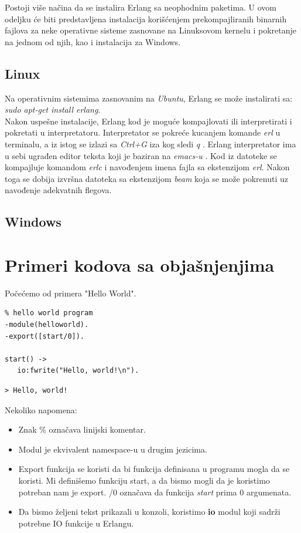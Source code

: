 \documentclass[a4paper]{article}
\begin{document}
{Postoji više načina da se instalira Erlang sa neophodnim paketima.
U ovom odeljku će biti predstavljena instalacija korišćenjem prekompajliranih binarnih fajlova 
za neke operativne sisteme zasnovane na Linuksovom kernelu i pokretanje na jednom od njih, kao 
i instalacija za Windows.

\subsection{Linux}
\label{subsec:instalacijaLinux}

Na operativnim sistemima zasnovanim na {\em Ubuntu}, Erlang se može instalirati sa:
{\em sudo apt-get install erlang}. \\

Nakon uspešne instalacije, Erlang kod je moguće kompajlovati
ili interpretirati i pokretati u interpretatoru.
Interpretator se pokreće kucanjem komande {\em erl} u terminalu, a iz istog
se izlazi sa {\em Ctrl+G} iza kog sledi {\em q} \cite{book_joe}.
Erlang interpretator ima u sebi ugrađen editor teksta koji je baziran na {\em emacs-u} \cite{book_fred}.
Kod iz datoteke se kompajluje komandom {\em erlc} i navođenjem imena fajla sa ekstenzijom {\em erl}.
Nakon toga se dobija izvršna datoteka sa ekstenzijom {\em beam} koja se može
pokrenuti uz navođenje adekvatnih flegova. 

\subsection{Windows}
\label{subsec:instalacijaWindows}


\section{Primeri kodova sa objašnjenjima}
\label{sec:primeri}
Po\v ce\' cemo od primera "Hello World".  
\begin{verbatim}
% hello world program
-module(helloworld). 
-export([start/0]). 

start() -> 
   io:fwrite("Hello, world!\n").
\end{verbatim}
\begin{verbatim}
> Hello, world!
\end{verbatim}

Nekoliko napomena:
\begin{itemize}
  \item Znak \% ozna\v cava linijski komentar.
  \item Modul je ekvivalent namespace-u u drugim jezicima.
  \item Export funkcija se koristi da bi funkcija definisana u programu mogla da se koristi. Mi defini\v semo funkciju start, a da bismo mogli da je koristimo potreban nam je export. /0 ozna\v cava da funkcija \textit{start} prima 0 argumenata.
  \item Da bismo \v zeljeni tekst prikazali u konzoli, koristimo \textbf{io} modul koji sadr\v zi potrebne IO funkcije u Erlangu.
\end{itemize}

}
\end{document}
